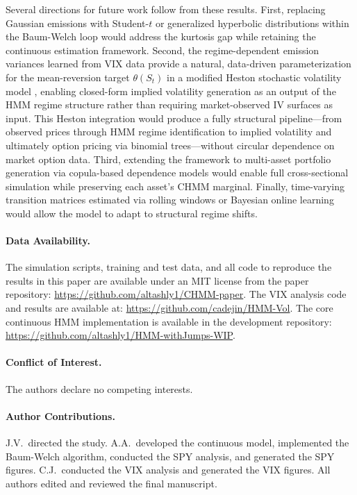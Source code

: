 Several directions for future work follow from these results.
First, replacing Gaussian emissions with Student-$t$ or generalized hyperbolic distributions within the Baum-Welch loop would address the kurtosis gap while retaining the continuous estimation framework.
Second, the regime-dependent emission variances learned from VIX data provide a natural, data-driven parameterization for the mean-reversion target $\theta(S_t)$ in a modified Heston stochastic volatility model \citep{heston1993closed}, enabling closed-form implied volatility generation as an output of the HMM regime structure rather than requiring market-observed IV surfaces as input.
This Heston integration would produce a fully structural pipeline---from observed prices through HMM regime identification to implied volatility and ultimately option pricing via binomial trees---without circular dependence on market option data.
Third, extending the framework to multi-asset portfolio generation via copula-based dependence models \citep{alswaidan2026hybrid} would enable full cross-sectional simulation while preserving each asset's CHMM marginal.
Finally, time-varying transition matrices estimated via rolling windows or Bayesian online learning would allow the model to adapt to structural regime shifts.

\paragraph{Data Availability.}
The simulation scripts, training and test data, and all code to reproduce the results in this paper are available under an MIT license from the paper repository: \url{https://github.com/altashly1/CHMM-paper}.
The VIX analysis code and results are available at: \url{https://github.com/cadejin/HMM-Vol}.
The core continuous HMM implementation is available in the development repository: \url{https://github.com/altashly1/HMM-withJumps-WIP}.

\paragraph{Conflict of Interest.}
The authors declare no competing interests.

\paragraph{Author Contributions.}
J.V.\ directed the study.
A.A.\ developed the continuous model, implemented the Baum-Welch algorithm, conducted the SPY analysis, and generated the SPY figures.
C.J.\ conducted the VIX analysis and generated the VIX figures.
All authors edited and reviewed the final manuscript.
